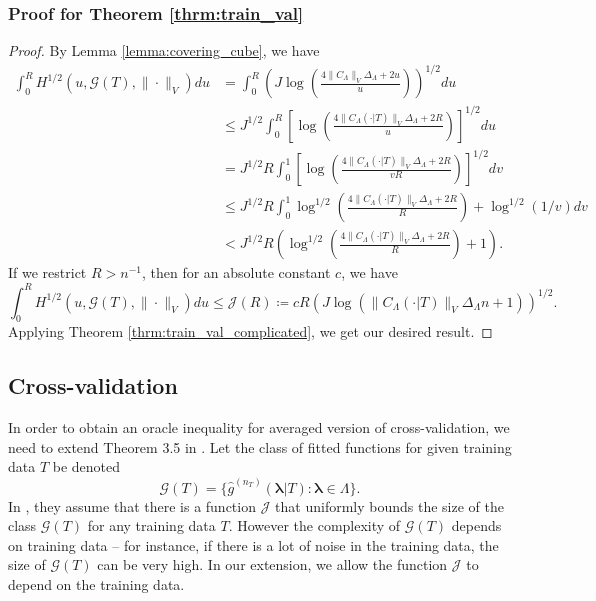 \documentclass[10pt]{book}
\theoremstyle{definition}
\begin{document}
\subsubsection{Proof for Theorem \ref{thrm:train_val}}
\begin{proof}
	By Lemma \ref{lemma:covering_cube}, we have
	\begin{align}
	\int_{0}^{R}H^{1/2}(u,\mathcal{G}(T),\|\cdot\|_{V})du 
	&= \int_{0}^{R} \left ( 
	J \log \left(\frac{4 \|C_\Lambda\|_V \Delta_{\Lambda}+2u}{u}\right)
	\right )^{1/2}
	du\\
	& \le J^{1/2}\int_{0}^{R}\left[
	\log\left(
	\frac{4 \|C_\Lambda(\cdot | T)\|_V \Delta_{\Lambda} + 2R }
	{u}
	\right)
	\right]^{1/2}du\\
	& = J^{1/2}R \int_{0}^{1}\left[
	\log\left(
	\frac{4 \|C_\Lambda(\cdot | T)\|_V \Delta_{\Lambda} + 2R }
	{vR}
	\right)
	\right]^{1/2}dv\\
	& \le J^{1/2}R \int_{0}^{1}
	\log^{1/2}\left(
	\frac{4 \|C_\Lambda(\cdot | T)\|_V \Delta_{\Lambda} + 2R}
	{R}
	\right)
	+
	\log^{1/2}(1/v)
	dv\\
	& < J^{1/2}R \left (
	\log^{1/2}\left(
	\frac{4 \|C_\Lambda(\cdot | T)\|_V \Delta_{\Lambda} + 2R}
	{R}
	\right)
	+
	1
	\right ).
	\end{align}
	If we restrict $R > n^{-1}$, then for an absolute constant $c$, we have
	\begin{equation}
	\label{eq:train_val_entropy}
	\int_{0}^{R}H^{1/2}(u,\mathcal{G}(T),\|\cdot\|_{V})du
	\le
	\mathcal{J}(R) 
	\coloneqq c R\left ( J \log(\|C_\Lambda(\cdot |T)\|_V \Delta_{\Lambda} n + 1) \right )^{1/2}.
	\end{equation}
	Applying Theorem \ref{thrm:train_val_complicated}, we get our desired result.
\end{proof}

\subsection{Cross-validation}
\label{app:cv}
In order to obtain an oracle inequality for averaged version of cross-validation, we need to extend Theorem 3.5 in \citet{lecue2012oracle}.
Let the class of fitted functions for given training data $T$ be denoted
$$
\mathcal{G}(T) = \{\hat{g}^{(n_T)}(\boldsymbol{\lambda}| T) : \boldsymbol{\lambda} \in \Lambda\}.
$$
In \citet{lecue2012oracle}, they assume that there is a function $\mathcal{J}$ that uniformly bounds the size of the class $\mathcal{G}(T)$ for any training data $T$.
However the complexity of $\mathcal{G}(T)$ depends on training data -- for instance, if there is a lot of noise in the training data, the size of $\mathcal{G}(T)$ can be very high.
In our extension, we allow the function $\mathcal{J}$ to depend on the training data.
\end{document}
